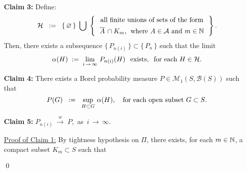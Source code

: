 \vskip 0.5cm
\begin{center}
\begin{minipage}{6.5in}
\textbf{Claim 3:}\quad
Define:
\begin{equation*}
\mathcal{H}
\;\; := \;\;
\left\{\,\varemptyset\,\right\}
\;\bigcup\;
\left\{\,
\begin{array}{c}
\textnormal{all finite unions of sets of the form}
\\
\textnormal{$\overline{A}\,\overset{{\color{white}1}}{\cap}K_{m}$, \;where $A \in \mathcal{A}$ and $m \in \N$}
\end{array}
\,\right\}.
\end{equation*}
Then, there exists a subsequence $\{\,P_{n(i)}\,\} \subset \{\,P_{n}\,\}$ such that the limit
\begin{equation*}
\alpha(H) \; := \;
\lim_{i\,\rightarrow\,\infty}\,P_{n(i)}(H) \;\;\,\textnormal{exists},
\;\;
\textnormal{for each $H \in \mathcal{H}$}.
\end{equation*}
\end{minipage}
\end{center}

\vskip 0.5cm
\begin{center}
\begin{minipage}{6.5in}
\textbf{Claim 4:}\quad
There exists a Borel probability measure $P \in \mathcal{M}_{1}(S,\mathcal{B}(S))$ such that
\begin{equation*}
P(G)
\;\; := \;\;
\sup_{H\subset G}\,\alpha(H),
\quad
\textnormal{for each open subset $G \subset S$}.
\end{equation*}
\end{minipage}
\end{center}

\vskip 0.5cm
\begin{center}
\begin{minipage}{6.5in}
\textbf{Claim 5:}\quad
$P_{n(i)} \;\overset{w}{\longrightarrow}\; P$,\,
as \,$i\,\longrightarrow\,\infty$.
\end{minipage}
\end{center}

\vskip 0.2cm
\noindent
\underline{Proof of Claim 1:}\quad
By tightness hypothesis on $\Pi$, there exists, for each $m \in \mathbb{N}$, a compact subset $K_{m} \subset S$ such that




\qed
